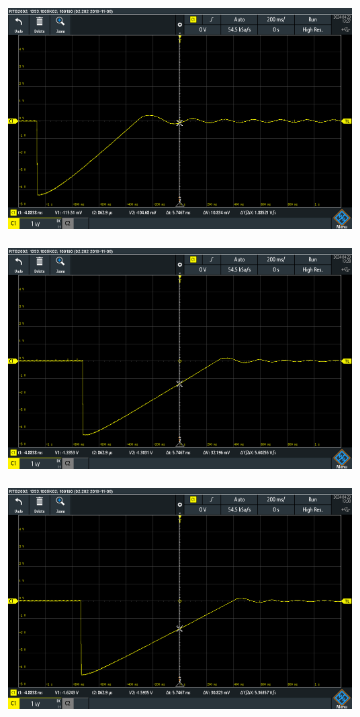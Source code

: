 \begin{figure}
	\setcounter{figure}{-1}
	\centering
	\begin{subfigure}{0.48\columnwidth}
		\setcounter{subfigure}{4}
		\centering
		\includegraphics[width=0.8\linewidth]{src/figures/oscilloscope-raw/p100-d0.png}
		\label{fig:oscilloscope-raw-p100-d0}
	\end{subfigure}
	\begin{subfigure}{0.48\columnwidth}
		\centering
		\includegraphics[width=0.8\linewidth]{src/figures/oscilloscope-raw/p100-d60.png}
		\label{fig:oscilloscope-raw-p100-d60}
	\end{subfigure}
	\begin{subfigure}{0.48\columnwidth}
		\centering
		\includegraphics[width=0.8\linewidth]{src/figures/oscilloscope-raw/p100-d80.png}

\end{subfigure}
\end{figure}
